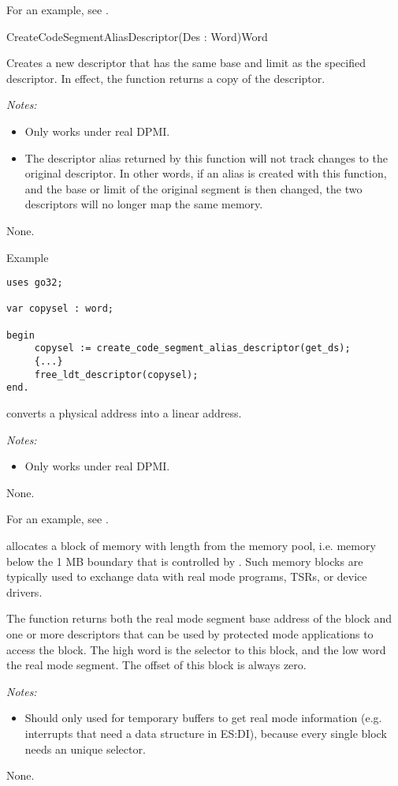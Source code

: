For an example, see .

{CreateCodeSegmentAliasDescriptor}{(Des : Word)}{Word}
{
Creates a new descriptor that has the same base and limit as the
specified descriptor.  In effect, the function returns a copy of the
descriptor.

{\em Notes:}
\begin{itemize}
\item Only works under real DPMI.
\item The descriptor alias returned by this function will not track changes
to the original descriptor. In other words, if an alias is created with
this function, and the base or limit of the original segment is then
changed, the two descriptors will no longer map the same memory.
\end{itemize}
}
{None.}
{}
\begin{FPKList}
\item[Example]
\begin{verbatim}
uses go32;

var copysel : word;

begin
     copysel := create_code_segment_alias_descriptor(get_ds);
     {...}
     free_ldt_descriptor(copysel);
end.
\end{verbatim}
\end{FPKList}

{ converts a physical address  into 
a linear address.

{\em Notes:}
\begin{itemize}
\item Only works under real DPMI.
\end{itemize}
}{None.}{}

For an example, see .

{
allocates a block of memory with length  from the \dos memory pool, 
i.e. memory below the 1 MB boundary that is controlled by \dos. 
Such memory blocks are typically used to exchange data with real mode 
programs, TSRs, or device drivers. 

The function returns both the real mode segment base address of
the block and one or more descriptors that can be used by protected mode
applications to access the block.
The high word is the selector to this block, and the low word the
\dos real mode segment. The offset of this block is always zero.

{\em Notes:}
\begin{itemize}
\item Should only used for temporary buffers to get real mode information
(e.g. interrupts that need a data structure in ES:DI), because every
single block needs an unique selector.
\end{itemize}
}{None.}{}

